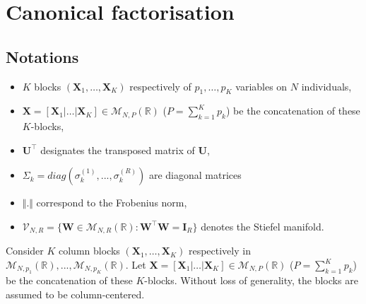 \documentclass[11pt]{article}
\newcommand{\W}{\mathbf{W}}
\newcommand{\I}{\mathbf{I}}
\newcommand{\Stiefel}[2]{\mathcal V_{#1,#2}}
\begin{document}
\section{Canonical factorisation}
\subsection*{Notations}

\begin{itemize}
	\item $K$ blocks  $(\textbf{X}_1,\ldots,\textbf{X}_K)$ respectively of $p_1,\ldots,p_K$ variables on $N$ individuals,
	\item  $\textbf{X}=[\textbf{X}_1|\ldots|\textbf{X}_K]\in \mathcal M_{N,P}(\mathbb R)$ ($P=\sum_{k=1}^K p_k$) be the concatenation of these $K$-blocks,
	\item $\textbf{U}^\intercal$ designates the transposed matrix of $\textbf{U}$, 
	\item $\Sigma_k=diag(\sigma_k^{(1)},...,\sigma_k^{(R)})$ are diagonal matrices 
	\item $\Vert . \Vert$ correspond to the Frobenius norm,
	\item $\Stiefel{N}{R}=\{\W\in\mathcal M_{N,R}(\mathbb R):\W^\intercal\W=\I_R\}$
denotes the Stiefel manifold.
\end{itemize}
 
Consider $K$ column blocks  $(\textbf{X}_1,\ldots,\textbf{X}_K)$ respectively in $\mathcal M_{N,p_1}(\mathbb R),...,\mathcal M_{N,p_K}(\mathbb R)$. Let $\textbf{X}=[\textbf{X}_1|\ldots|\textbf{X}_K]\in \mathcal M_{N,P}(\mathbb R)$ ($P=\sum_{k=1}^K p_k$) be the concatenation of these $K$-blocks. Without loss of generality, the blocks are assumed to be column-centered.
\end{document}
